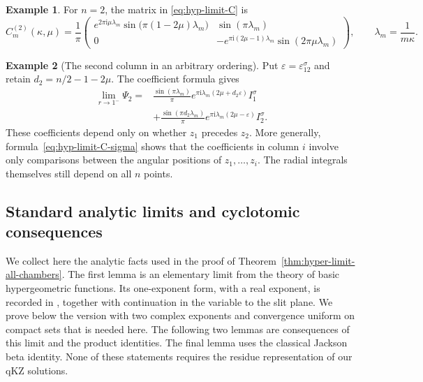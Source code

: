 \documentclass[12pt]{amsart}
\theoremstyle{definition}
\numberwithin{equation}{section}
\theoremstyle{definition}
\newtheorem*{example}{Example}
\let\eps\varepsilon
\let\ka\kappa
\let\si\sigma
\def\beq{\begin{equation}}
\def\eeq{\end{equation}}
\begin{document}
\begin{example}
For $n=2$, the matrix in \eqref{eq:hyp-limit-C} is
\beq\label{eq:hyp-limit-C2}
 C_m^{(2)}(\ka,\mu)=\frac1\pi
 \begin{pmatrix}
 e^{2\pi\mathrm{i}\mu\lambda_m}
       \sin\bigl(\pi(1-2\mu)\lambda_m\bigr)
 &\sin(\pi\lambda_m)\\[4pt]
 0
 &-e^{\pi\mathrm{i}(2\mu-1)\lambda_m}
       \sin(2\pi\mu\lambda_m)
 \end{pmatrix},
 \qquad \lambda_m=\frac1{m\ka}.
\eeq
\end{example}

\begin{example}[The second column in an arbitrary ordering]
Put $\eps=\eps_{12}^\si$ and retain $d_2=n/2-1-2\mu$.
The coefficient formula gives
\beq\label{eq:hyp-limit-second-column-sigma}
 \begin{aligned}
 \lim_{r\to1^-}\Psi_2
 ={}&\frac{\sin(\pi\lambda_m)}{\pi}
 e^{\pi\mathrm{i}\lambda_m(2\mu+d_2\eps)} I_1^\si\\
 &+\frac{\sin(\pi d_2\lambda_m)}{\pi}
 e^{\pi\mathrm{i}\lambda_m(2\mu-\eps)} I_2^\si.
 \end{aligned}
\eeq
These coefficients depend only on whether $z_1$ precedes $z_2$.
More generally, formula~\eqref{eq:hyp-limit-C-sigma} shows that the
coefficients in column $i$ involve only comparisons between the
angular positions of $z_1,\ldots,z_i$. The radial integrals themselves
still depend on all $n$ points.
\end{example}


\subsection{Standard analytic limits and cyclotomic consequences}
\label{subsec:hyp-limit-analytic}

We collect here the analytic facts used in the proof of
Theorem~\ref{thm:hyper-limit-all-chambers}.  The first lemma is
an elementary limit from the theory of basic hypergeometric
functions. Its one-exponent form, with a real exponent, is
recorded in \cite[Section~1.3, formulas (1.3.18)--(1.3.19)]{GR04},
together with continuation in the variable to the slit plane.
We prove below the version with two complex exponents and
convergence uniform on compact sets that is needed here.
The following two lemmas are consequences
of this limit and the product identities.  The final lemma uses
the classical Jackson beta identity.  None of these statements
requires the residue representation of our qKZ solutions.
\end{document}
